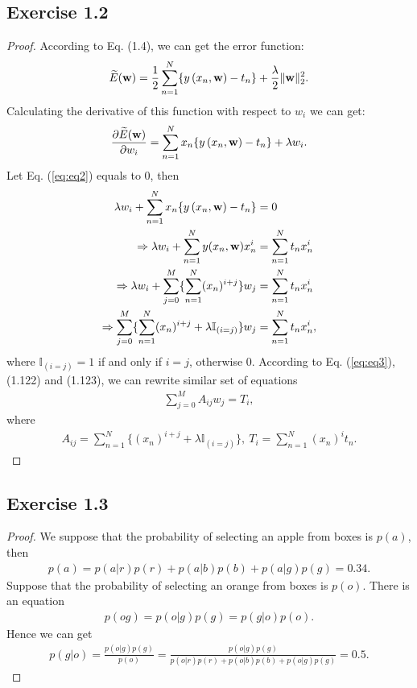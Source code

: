 \documentclass[11pt]{article}
\theoremstyle{definition}
\begin{document}
\subsection{Exercise 1.2}
\begin{proof}
According to Eq. (1.4), we can get the error function:
\begin{align*}
\widetilde{E}(\bold{w}) = \frac{1}{2}\sum^{N}_{n=1} \{ y\left(x_n,\bold{w}\right) - t_n \} + \frac{\lambda}{2}\lVert\bold{w}\rVert^2_2.
\end{align*}
Calculating the derivative of this function with respect to $w_i$ we can get:
\begin{align}
\frac{\partial \widetilde{E}(\bold{w})}{\partial w_i} = \sum^{N}_{n=1}x_n\{y\left(x_n,\bold{w}\right) - t_n\} + \lambda w_i.  \label{eq:eq2}   
\end{align}
Let Eq. (\ref{eq:eq2}) equals to 0, then
\begin{align}
\lambda w_i + \sum^{N}_{n=1}x_n\{y\left(x_n,\bold{w}\right) - t_n\} &= 0 \nonumber\\
\Rightarrow\lambda w_i +  \sum^N_{n=1}y(x_n,\bold{w})x_n^i &= \sum^N_{n=1}t_nx_n^i \nonumber\\
\Rightarrow\lambda w_i +   \sum^M_{j=0}\{\sum^N_{n=1}(x_n)^{i+j}\}w_j &= \sum^N_{n=1}t_nx_n^i \nonumber\\
\Rightarrow\sum^M_{j=0}\{\sum^N_{n=1}(x_n)^{i+j}+\lambda\mathbb{I}_{(i=j)}\}w_j &= \sum^N_{n=1}t_nx_n^i, \label{eq:eq3}
\end{align}
where $\mathbb{I}_{(i=j)} = 1$ if and only if $i=j$, otherwise 0.
According to Eq. (\ref{eq:eq3}), (1.122) and (1.123), we can rewrite similar set of equations
\begin{align*}
\sum^{M}_{j=0}A_{ij}w_j = T_i,
\end{align*}
where
\begin{align*}
A_{ij} = \sum^N_{n=1}\{(x_n)^{i+j}+\lambda\mathbb{I}_{(i=j)}\},\  T_i = \sum^N_{n=1}(x_n)^it_n.
\end{align*}
\end{proof}

\subsection{Exercise 1.3}
\begin{proof}
We suppose that the probability of selecting an apple from boxes is $p(a)$, then
\begin{align*}
p(a) = p(a|r)p(r) + p(a|b)p(b) + p(a|g)p(g) = 0.34.
\end{align*}
Suppose that the probability of selecting an orange from boxes is $p(o)$. There is an equation
\begin{align*}
p(og) = p(o|g)p(g) = p(g|o)p(o).
\end{align*}
Hence we can get
\begin{align*}
p(g|o) = \frac{p(o|g)p(g)}{p(o)} = \frac{p(o|g)p(g)}{p(o|r)p(r) + p(o|b)p(b) + p(o|g)p(g)} = 0.5.
\end{align*}
\end{proof}
\end{document}
